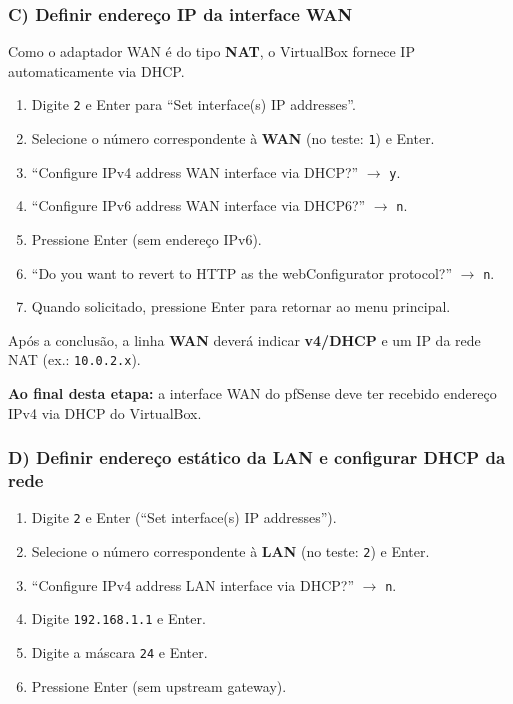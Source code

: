 \subsubsection*{C) Definir endereço IP da interface WAN}

Como o adaptador WAN é do tipo \textbf{NAT}, o VirtualBox fornece IP automaticamente via DHCP.

\begin{enumerate}
  \item Digite \texttt{2} e Enter para ``Set interface(s) IP addresses''.
  \item Selecione o número correspondente à \textbf{WAN} (no teste: \texttt{1}) e Enter.
  \item ``Configure IPv4 address WAN interface via DHCP?'' $\rightarrow$ \texttt{y}.
  \item ``Configure IPv6 address WAN interface via DHCP6?'' $\rightarrow$ \texttt{n}.
  \item Pressione Enter (sem endereço IPv6).
  \item ``Do you want to revert to HTTP as the webConfigurator protocol?'' $\rightarrow$ \texttt{n}.
\end{enumerate}


\begin{enumerate}\setcounter{enumi}{6}
  \item Quando solicitado, pressione Enter para retornar ao menu principal.
\end{enumerate}

Após a conclusão, a linha \textbf{WAN} deverá indicar \textbf{v4/DHCP} e um IP da rede NAT (ex.: \texttt{10.0.2.x}).


\begin{notebox}
\textbf{Ao final desta etapa:} a interface WAN do pfSense deve ter recebido endereço IPv4 via DHCP do VirtualBox.
\end{notebox}

\subsubsection*{D) Definir endereço estático da LAN e configurar DHCP da rede}

\begin{enumerate}
  \item Digite \texttt{2} e Enter (``Set interface(s) IP addresses'').
  \item Selecione o número correspondente à \textbf{LAN} (no teste: \texttt{2}) e Enter.
  \item ``Configure IPv4 address LAN interface via DHCP?'' $\rightarrow$ \texttt{n}.
  \item Digite \texttt{192.168.1.1} e Enter.
  \item Digite a máscara \texttt{24} e Enter.
  \item Pressione Enter (sem upstream gateway).
\end{enumerate}

